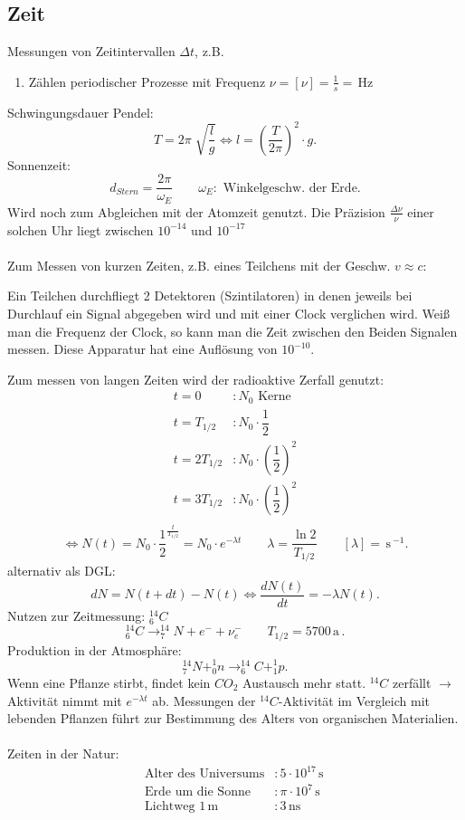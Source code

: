 \documentclass[a4paper,12pt]{article}
\begin{document}
\subsection{Zeit}
Messungen von Zeitintervallen $\Delta t$, z.B.
\begin{enumerate}[wide,label=$\cdot$]
        \item Zählen periodischer Prozesse mit Frequenz $\nu =[\nu ]=\tfrac{1}{s}=\,\text{Hz}\,$ 
\end{enumerate}
Schwingungsdauer Pendel:
\[ 
T=2\pi \sqrt[]{\dfrac{l}{g}}\Leftrightarrow l=\left( \dfrac{T}{2\pi }\right) ^2\cdot g
.\] 
Sonnenzeit:
\[ 
        d_{Stern}=\dfrac{2\pi }{\omega _E}\qquad \omega _E:\text{ Winkelgeschw. der Erde}
.\] 
Wird noch zum Abgleichen mit der Atomzeit genutzt. Die Präzision $\tfrac{\Delta \nu }{\nu }$  einer solchen Uhr liegt zwischen $10^{-14}$ und $10^{-17}$ \\\\
Zum Messen von kurzen Zeiten, z.B. eines Teilchens mit der Geschw. $v\approx c$:
\begin{center} Ein Teilchen durchfliegt 2 Detektoren (Szintilatoren) in denen jeweils bei Durchlauf ein Signal abgegeben wird und mit einer \glqq Clock\grqq{} verglichen wird. Weiß man die Frequenz der Clock, so kann man die Zeit zwischen den Beiden Signalen messen. Diese Apparatur hat eine Auflösung von $10^{-10}$.\end{center}
Zum messen von langen Zeiten wird der radioaktive Zerfall genutzt:
\begin{align*}
        t=0&:N_0\text{ Kerne}\\
        t=T_{1/2}&:N_0\cdot \dfrac{1}{2}\\
        t=2T_{1/2}&:N_0\cdot \left( \dfrac{1}{2}\right) ^2\\
        t=3T_{1/2}&:N_0\cdot \left( \dfrac{1}{2}\right) ^2\\
\end{align*}
\[ 
        \Leftrightarrow N\left( t\right) =N_0\cdot \dfrac{1}{2}^{\tfrac{t}{T_{1/2} }}=N_0\cdot e^{-\lambda t}\qquad \lambda =\dfrac{\ln 2}{T_{1/2}}\qquad [\lambda ]=\,\text{s}\,^{-1}
.\] 
alternativ als DGL:
\[ 
dN=N\left( t+dt\right) -N\left( t\right) \Leftrightarrow \dfrac{dN\left( t\right) }{dt}=-\lambda N\left( t\right) 
.\]
Nutzen zur Zeitmessung: $^{14}_{6}C$ 
\[ 
^{14}_{6}C\rightarrow ^{14}_{7}N+e^{-}+\nu ^{-}_{e}\qquad T_{1/2}=5700\,\text{a}\,
.\] 
Produktion in der Atmosphäre:
\[ 
^{14}_{7}N+^{1}_{0}n\rightarrow ^{14}_{6}C+^{1}_{1}p
.\] 
Wenn eine Pflanze stirbt, findet kein $CO_{2}$ Austausch mehr statt. $^{14}C$ zerfällt $\rightarrow $ Aktivität nimmt mit $e^{-\lambda t}$ ab. Messungen der $^{14}C$-Aktivität im Vergleich mit lebenden Pflanzen führt zur Bestimmung des Alters von organischen Materialien.\\\\
Zeiten in der Natur:
\begin{align*}
        \text{Alter des Universums}&:5\cdot 10^{17}\,\text{s}\,\\
        \text{Erde um die Sonne}&:\pi \cdot 10^{7}\,\text{s}\,\\
        \text{Lichtweg }1\,\text{m}\,&:3\,\text{ns}\,
\end{align*}
\end{document}
